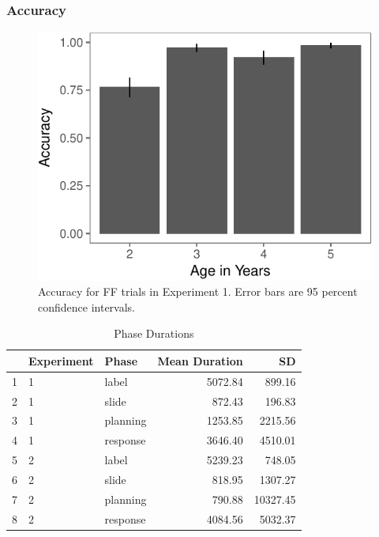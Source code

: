 \documentclass[a4paper,man,apacite,floatsintext]{apa6}
\newenvironment{CodeChunk}{}{}
\begin{document}
\subsubsection{Accuracy}\label{accuracy}

\begin{CodeChunk}
\begin{figure}[b]

{\centering \includegraphics{figs/acc_e1-1} 

}

\caption[Accuracy for FF trials in Experiment 1]{Accuracy for FF trials in Experiment 1. Error bars are 95 percent confidence intervals.}\label{fig:acc_e1}
\end{figure}
\end{CodeChunk}

\begin{table}[b]
\centering
\begin{tabular}{rllrr}
  \hline
 & Experiment & Phase & Mean Duration & SD \\ 
  \hline
1 & 1 & label & 5072.84 & 899.16 \\ 
  2 & 1 & slide & 872.43 & 196.83 \\ 
  3 & 1 & planning & 1253.85 & 2215.56 \\ 
  4 & 1 & response & 3646.40 & 4510.01 \\ 
   \hline
5 & 2 & label & 5239.23 & 748.05 \\ 
  6 & 2 & slide & 818.95 & 1307.27 \\ 
  7 & 2 & planning & 790.88 & 10327.45 \\ 
  8 & 2 & response & 4084.56 & 5032.37 \\ 
   \hline
\end{tabular}
\caption{Phase Durations} 
\label{tab:phases}
\end{table}
\end{document}
